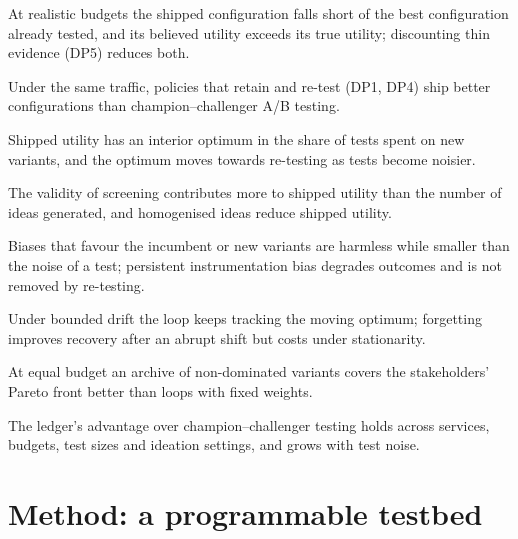 \documentclass[preprint,12pt,authoryear]{elsarticle}
\theoremstyle{definition}
\begin{document}
\begin{description}[leftmargin=*,itemsep=2pt,font=\normalfont\itshape]
\item[H1 (cost of choosing).] At realistic budgets the shipped configuration falls short of the best configuration already tested, and its believed utility exceeds its true utility; discounting thin evidence (DP5) reduces both.
\item[H2 (governance).] Under the same traffic, policies that retain and re-test (DP1, DP4) ship better configurations than champion--challenger A/B testing.
\item[H3 (allocation).] Shipped utility has an interior optimum in the share of tests spent on new variants, and the optimum moves towards re-testing as tests become noisier.
\item[H4 (generative ideation).] The validity of screening contributes more to shipped utility than the number of ideas generated, and homogenised ideas reduce shipped utility.
\item[H5 (bias).] Biases that favour the incumbent or new variants are harmless while smaller than the noise of a test; persistent instrumentation bias degrades outcomes and is not removed by re-testing.
\item[H6 (drift).] Under bounded drift the loop keeps tracking the moving optimum; forgetting improves recovery after an abrupt shift but costs under stationarity.
\item[H7 (stakeholders).] At equal budget an archive of non-dominated variants covers the stakeholders' Pareto front better than loops with fixed weights.
\item[H8 (robustness).] The ledger's advantage over champion--challenger testing holds across services, budgets, test sizes and ideation settings, and grows with test noise.
\end{description}

\section{Method: a programmable testbed}
\label{sec:method}
\end{document}
